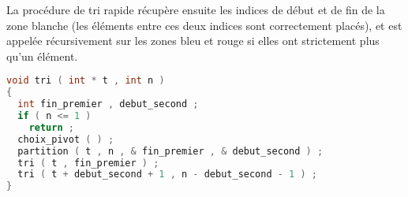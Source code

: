 \question La procédure de tri rapide récupère ensuite les indices de
début et de fin de la zone blanche (les éléments entre ces deux
indices sont correctement placés), et est appelée récursivement sur
les zones bleu et rouge si elles ont strictement plus qu'un élément.
\begin{solutioncachee}
  \begin{lstlisting}[language=C]
void tri ( int * t , int n )
{
  int fin_premier , debut_second ;
  if ( n <= 1 )
    return ;
  choix_pivot ( ) ;
  partition ( t , n , & fin_premier , & debut_second ) ;
  tri ( t , fin_premier ) ;
  tri ( t + debut_second + 1 , n - debut_second - 1 ) ;
}  
  \end{lstlisting}
\end{solutioncachee}



